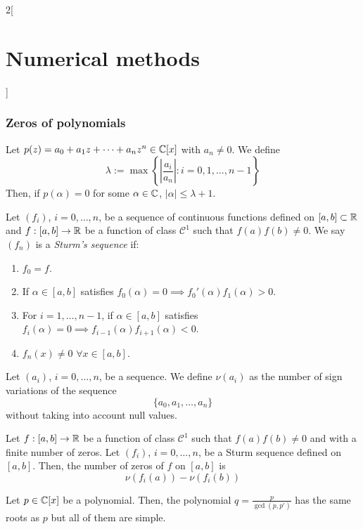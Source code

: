 \documentclass[../../../main.tex]{subfiles}
\begin{document}
\begin{multicols}{2}[\section{Numerical methods}]
    \subsubsection*{Zeros of polynomials}
    \begin{lemma}
        Let $p(z)=a_0+a_1z+\cdots+a_nz^n\in\mathbb{C} [x]$ with $a_n\ne 0$. We define $$\lambda:=\max\left\{\left|\frac{a_i}{a_n}\right|:i=0,1,\ldots,n-1\right\}$$ Then, if $p(\alpha)=0$ for some $\alpha\in\mathbb{C} $, $|\alpha|\leq\lambda+1$.
    \end{lemma}
    \begin{definition}
        Let $(f_i)$, $i=0,\ldots,n$, be a sequence of continuous functions defined on $[a,b]\subset\mathbb{R}$ and $f:[a,b]\rightarrow\mathbb{R}$ be a function of class $\mathcal{C}^1$ such that $f(a)f(b)\ne 0$. We say $(f_n)$ is a \textit{Sturm's sequence} if:
        \begin{enumerate}
            \item $f_0=f$.
            \item If $\alpha\in[a,b]$ satisfies $f_0(\alpha)=0\implies f_0'(\alpha)f_1(\alpha)>0$.
            \item For $i=1,\ldots,n-1$, if $\alpha\in[a,b]$ satisfies $f_i(\alpha)=0\implies f_{i-1}(\alpha)f_{i+1}(\alpha)<0$.
            \item $f_n(x)\ne0$ $\forall x\in[a,b]$.
        \end{enumerate}
    \end{definition}
    \begin{definition}
        Let $(a_i)$, $i=0,\ldots,n$, be a sequence. We define $\nu(a_i)$ as the number of sign variations of the sequence $$\{a_0,a_1,\ldots,a_n\}$$ without taking into account null values.
    \end{definition}
    \begin{theorem}
        Let $f:[a,b]\rightarrow\mathbb{R}$ be a function of class $\mathcal{C}^1$ such that $f(a)f(b)\ne 0$ and with a finite number of zeros. Let $(f_i)$, $i=0,\ldots,n$, be a Sturm sequence defined on $[a,b]$. Then, the number of zeros of $f$ on $[a,b]$ is $$\nu\left(f_i(a)\right)-\nu\left(f_i(b)\right)$$
    \end{theorem}
    \begin{lemma}
        Let $p\in\mathbb{C} [x]$ be a polynomial. Then, the polynomial $\displaystyle q=\frac{p}{\gcd(p,p')}$ has the same roots as $p$ but all of them are simple.
    \end{lemma}
    \begin{prop}

\end{prop}
\end{multicols}
\end{document}
